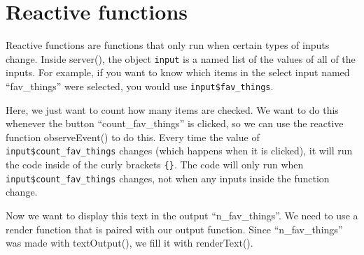 \documentclass[
]{book}
\newenvironment{Shaded}{\begin{snugshade}}{\end{snugshade}}
\newcommand{\CommentTok}[1]{\textcolor[rgb]{0.56,0.35,0.01}{\textit{#1}}}
\newcommand{\ControlFlowTok}[1]{\textcolor[rgb]{0.13,0.29,0.53}{\textbf{#1}}}
\newcommand{\FunctionTok}[1]{\textcolor[rgb]{0.00,0.00,0.00}{#1}}
\newcommand{\NormalTok}[1]{#1}
\newcommand{\OtherTok}[1]{\textcolor[rgb]{0.56,0.35,0.01}{#1}}
\newcommand{\SpecialCharTok}[1]{\textcolor[rgb]{0.00,0.00,0.00}{#1}}
\newcommand{\StringTok}[1]{\textcolor[rgb]{0.31,0.60,0.02}{#1}}
\begin{document}
\hypertarget{first-reactive}{%
\section{Reactive functions}\label{first-reactive}}

Reactive functions are functions that only run when certain types of inputs change. Inside server(), the object \texttt{input} is a named list of the values of all of the inputs. For example, if you want to know which items in the select input named ``fav\_things'' were selected, you would use \texttt{input\$fav\_things}.

Here, we just want to count how many items are checked. We want to do this whenever the button ``count\_fav\_things'' is clicked, so we can use the reactive function observeEvent() to do this. Every time the value of \texttt{input\$count\_fav\_things} changes (which happens when it is clicked), it will run the code inside of the curly brackets \texttt{\{\}}. The code will only run when \texttt{input\$count\_fav\_things} changes, not when any inputs inside the function change.

\begin{Shaded}
\end{Shaded}

Now we want to display this text in the output ``n\_fav\_things''. We need to use a render function that is paired with our output function. Since ``n\_fav\_things'' was made with textOutput(), we fill it with renderText().

\begin{Shaded}
\end{Shaded}
\end{document}
